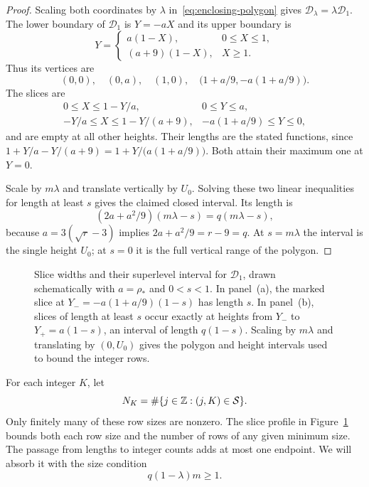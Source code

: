 \begin{proof}
Scaling both coordinates by $\lambda$ in~\eqref{eq:enclosing-polygon}
gives $\mathcal D_\lambda=\lambda\mathcal D_1$. The lower boundary
of $\mathcal D_1$ is $Y=-aX$ and its upper boundary is
\[
 Y=\begin{cases}
 a(1-X),&0\le X\le1,\\
 (a+9)(1-X),&X\ge1.
 \end{cases}
\]
Thus its vertices are
\[
 (0,0),\quad(0,a),\quad(1,0),\quad
 \bigl(1+a/9,-a(1+a/9)\bigr).
\]
The slices are
\[
 \begin{array}{ll}
 0\le X\le1-Y/a,&0\le Y\le a,\\[1mm]
 -Y/a\le X\le1-Y/(a+9),&-a(1+a/9)\le Y\le0,
 \end{array}
\]
and are empty at all other heights. Their lengths are the stated
functions, since
$1+Y/a-Y/(a+9)=1+Y/\bigl(a(1+a/9)\bigr)$.
Both attain their maximum one at $Y=0$.

Scale by $m\lambda$ and translate vertically by $U_0$. Solving
these two linear inequalities for length at least $s$ gives the
claimed closed interval. Its length is
\[
 (2a+a^2/9)(m\lambda-s)=q(m\lambda-s),
\]
because $a=3(\sqrt r-3)$ implies $2a+a^2/9=r-9=q$.
At $s=m\lambda$ the interval is the single height $U_0$; at $s=0$
it is the full vertical range of the polygon.
\end{proof}

\begin{figure}[htbp]
 \centering
 
 \caption{Slice widths and their superlevel interval for
 $\mathcal D_1$, drawn schematically with $a=\rho_*$ and
 $0<s<1$. In panel~(a), the marked slice at
 $Y_-=-a(1+a/9)(1-s)$ has length $s$. In panel~(b), slices of
 length at least $s$ occur exactly at heights from $Y_-$ to
 $Y_+=a(1-s)$, an interval of length $q(1-s)$.
 Scaling by $m\lambda$ and translating by $(0,U_0)$ gives the
 polygon and height intervals used to bound the integer rows.}
 \label{fig:slice-profile}
\end{figure}

For each integer $K$, let
\[
 N_K=\#\{j\in\mathbb Z:(j,K)\in\mathcal S\}.
\]
Only finitely many of these row sizes are nonzero. The slice profile
in Figure~\ref{fig:slice-profile} bounds both each row size and the
number of rows of any given minimum size.
The passage from lengths to integer counts adds at most one endpoint.
We will absorb it with the size condition
\begin{equation}\label{eq:scaling}
 q(1-\lambda)m\ge1.
\end{equation}

